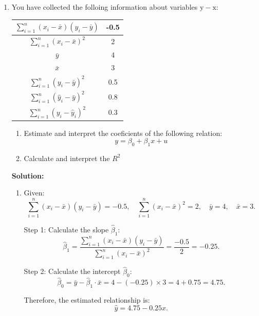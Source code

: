 \documentclass[12pt]{article}
\begin{document}
\begin{enumerate}
{\begin{enumerate}
Therefore, about $57.7 \%$ of the variation in $G P A$ is explained by $A C T$ in this small sample of students.
\end{enumerate}

}

\item You have collected the folloing information about variables $\mathrm{y}-\mathrm{x}$:
\begin{center}
\begin{tabular}{|c|c|}
\hline$\sum_{i=1}^n\left(x_i-\bar{x}\right)\left(y_i-\bar{y}\right)$ & -0.5 \\
\hline$\sum_{i=1}^n\left(x_i-\bar{x}\right)^2$ & 2 \\
\hline $\bar{y}$ & 4 \\
\hline $\bar{x}$ & 3 \\
\hline$\sum_{i=1}^n\left(y_i-\bar{y}\right)^2$ & 0.5 \\
\hline$\sum_{i=1}^n\left(\hat{y}_i-\bar{y}\right)^2$ & 0.8 \\
\hline$\sum_{i=1}^n\left(y_i-\hat{y}_i\right)^2$ & 0.3 \\
\hline
\end{tabular}
\end{center}
\begin{enumerate}
    \item Estimate and interpret the coeficients of the following relation:
    $$
y=\beta_0+\beta_1 x+u
$$

\item Calculate and interpret the $R^2$
\end{enumerate}

{\color{blue}
\noindent \textbf{Solution:}

\begin{enumerate}
    \item Given:
\[
\sum_{i=1}^n \left( x_i - \bar{x} \right) \left( y_i - \bar{y} \right) = -0.5, \quad \sum_{i=1}^n \left( x_i - \bar{x} \right)^2 = 2, \quad \bar{y} = 4, \quad \bar{x} = 3.
\]

Step 1: Calculate the slope \( \hat{\beta}_1 \):
\[
\hat{\beta}_1 = \frac{\sum_{i=1}^n \left( x_i - \bar{x} \right) \left( y_i - \bar{y} \right)}{\sum_{i=1}^n \left( x_i - \bar{x} \right)^2} = \frac{-0.5}{2} = -0.25.
\]

Step 2: Calculate the intercept \( \hat{\beta}_0 \):
\[
\hat{\beta}_0 = \bar{y} - \hat{\beta}_1 \cdot \bar{x} = 4 - (-0.25) \times 3 = 4 + 0.75 = 4.75.
\]

Therefore, the estimated relationship is:
\[
\hat{y} = 4.75 - 0.25x.
\]


\end{enumerate}}
\end{enumerate}
\end{document}
